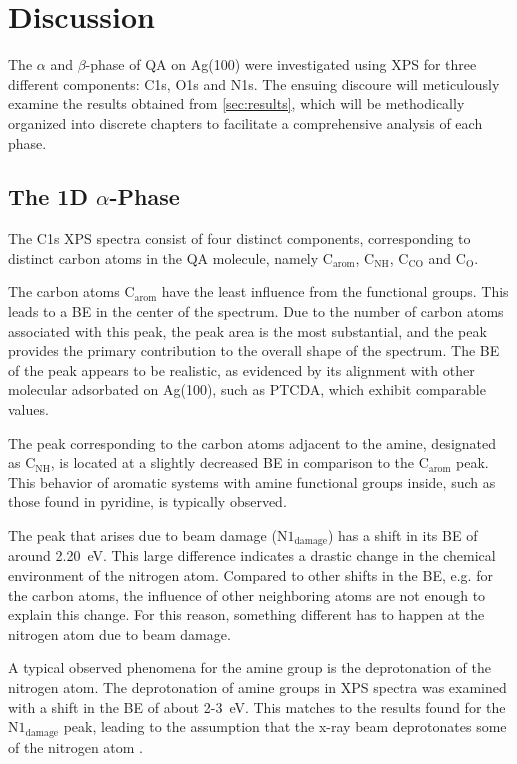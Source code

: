 \chapter{Discussion}

The $\alpha$ and $\beta$-phase of \ac{QA} on Ag(100) were investigated using \ac{XPS} for three different components: C1s, O1s and N1s. The ensuing discoure will meticulously examine the results obtained from \autoref{sec:results}, which will be methodically organized into discrete chapters to facilitate a comprehensive analysis of each phase.


\section{The 1D \texorpdfstring{$\alpha$}{alpha}-Phase}

The C1s \ac{XPS} spectra consist of four distinct components, corresponding to distinct carbon atoms in the \ac{QA} molecule, namely  $\mathrm{C_{arom}}$,  $\mathrm{C_{NH}}$,  $\mathrm{C_{CO}}$ and  $\mathrm{C_{O}}$.

The carbon atoms $\mathrm{C_{arom}}$ have the least influence from the functional groups. This leads to a \ac{BE} in the center of the spectrum. Due to the number of carbon atoms associated with this peak, the peak area is the most substantial, and the peak provides the primary contribution to the overall shape of the spectrum. The \ac{BE} of the peak appears to be realistic, as evidenced by its alignment with other molecular adsorbated on Ag(100), such as \ac{PTCDA}, which exhibit comparable values.\autocite{Bauer2014}

The peak corresponding to the carbon atoms adjacent to the amine, designated as $\mathrm{C_{NH}}$, is located at a slightly decreased \ac{BE} in comparison to the $\mathrm{C_{arom}}$ peak. This behavior of aromatic systems with amine functional groups inside, such as those found in pyridine, is typically observed.\autocite{Mendolicchio2019, Bagus2025}

The peak that arises due to beam damage ($\mathrm{N1_{damage}}$) has a shift in its \ac{BE} of around 2.20~\si{\eV}. This large difference indicates a drastic change in the chemical environment of the nitrogen atom. Compared to other shifts in the \ac{BE}, e.g. for the carbon atoms, the influence of other neighboring atoms are not enough to explain this change. For this reason, something different has to happen at the nitrogen atom due to beam damage.

A typical observed phenomena for the amine group is the deprotonation of the nitrogen atom. The deprotonation of amine groups in \ac{XPS} spectra was examined with a shift in the \ac{BE} of about 2-3~\si{\eV}.\autocite{Kang1990, Ruano2021}  This matches to the results found for the $\mathrm{N1_{damage}}$ peak, leading to the assumption that the x-ray beam deprotonates some of the nitrogen atom .

